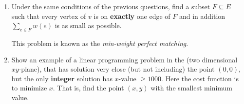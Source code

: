\documentclass[11pt,epic,leqno,eepic,psfig,]{article}
\renewcommand{\i}{\item}
\begin{document}
\begin{enumerate}
\i Under the same conditions of the previous questions, 
find a subset $F\subseteq E$ such that every vertex of $v$ is on {\bf exactly}  one edge of $F$ and in addition $\sum_{e\in F} w(e)$ is as small as possible.

This problem is known as the {\em  min-weight perfect matching}.

\i Show an example of a linear programming problem in the (two dimensional $xy$-plane), that has  solution very close (but not including) the point $(0,0)$, 
 but the only {\bf integer} solution has $x$-value $\geq 1000.$ Here the cost function is to minimize $x$. That is, find the point $(x,y)$ with the smallest minimum value.  



\end{enumerate} 
\end{document}
